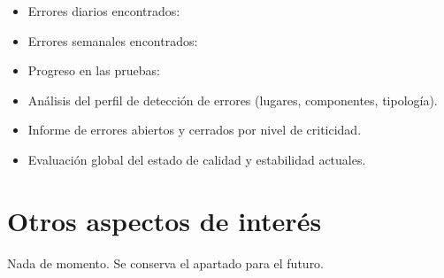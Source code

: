 \documentclass[12pt, a4paper, titlepage]{article}
\begin{document}
	\begin{itemize}
		\item Errores diarios encontrados:
		\item Errores semanales encontrados:
		\item Progreso en las pruebas:
		\item Análisis del perfil de detección de errores (lugares, componentes, tipología).
		\item Informe de errores abiertos y cerrados por nivel de criticidad.
		\item Evaluación global del estado de calidad y estabilidad actuales.
	\end{itemize}
	
	\section{Otros aspectos de interés}
	
	Nada de momento. Se conserva el apartado para el futuro.
	
\end{document}
